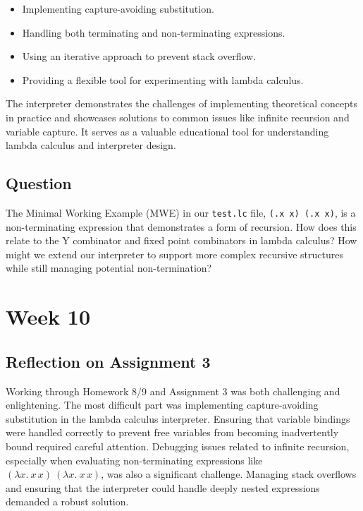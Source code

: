 \documentclass{article}
\theoremstyle{theorem}
\theoremstyle{definition}
\theoremstyle{remark}
\begin{document}
\begin{itemize}
    \item Implementing capture-avoiding substitution.
    \item Handling both terminating and non-terminating expressions.
    \item Using an iterative approach to prevent stack overflow.
    \item Providing a flexible tool for experimenting with lambda calculus.
\end{itemize}

The interpreter demonstrates the challenges of implementing theoretical concepts in practice and showcases solutions to common issues like infinite recursion and variable capture. It serves as a valuable educational tool for understanding lambda calculus and interpreter design.

\subsection{Question}

The Minimal Working Example (MWE) in our \texttt{test.lc} file, \texttt{(\x.x x) (\x.x x)}, is a non-terminating expression that demonstrates a form of recursion. How does this relate to the Y combinator and fixed point combinators in lambda calculus? How might we extend our interpreter to support more complex recursive structures while still managing potential non-termination?


\section{Week 10}

\subsection{Reflection on Assignment 3}

Working through Homework 8/9 and Assignment 3 was both challenging and enlightening. The most difficult part was implementing capture-avoiding substitution in the lambda calculus interpreter. Ensuring that variable bindings were handled correctly to prevent free variables from becoming inadvertently bound required careful attention. Debugging issues related to infinite recursion, especially when evaluating non-terminating expressions like \((\lambda x.\ x\, x)\ (\lambda x.\ x\, x)\), was also a significant challenge. Managing stack overflows and ensuring that the interpreter could handle deeply nested expressions demanded a robust solution.
\end{document}
